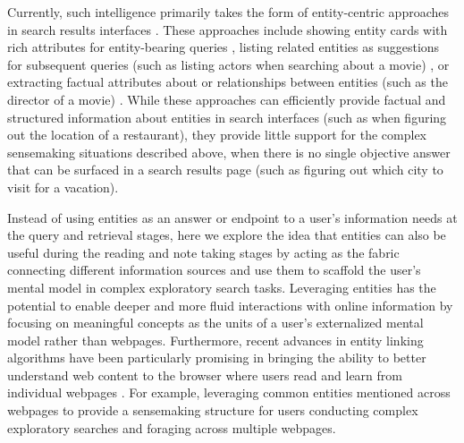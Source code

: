 
Currently, such intelligence primarily takes the form of entity-centric approaches in search results interfaces \cite{guo2009named,lin2012active}. These approaches include showing entity cards with rich attributes for entity-bearing queries \cite{miliaraki2015selena,bota}, listing related entities as suggestions for subsequent queries (such as listing actors when searching about a movie) \cite{blanco2013entity,bordino2013penguins,klouche2015designing}, or extracting factual attributes about or relationships between entities (such as the director of a movie) \cite{balog2010overview,cheng2007entityrank,D15-1038}. While these approaches can efficiently provide factual and structured information about entities in search interfaces (such as when figuring out the location of a restaurant), they provide little support for the complex sensemaking situations described above, when there is no single objective answer that can be surfaced in a search results page (such as figuring out which city to visit for a vacation).

Instead of using entities as an answer or endpoint to a user's information needs at the query and retrieval stages, here we explore the idea that entities can also be useful during the reading and note taking stages by acting as the fabric connecting different information sources and use them to scaffold the user's mental model in complex exploratory search tasks. Leveraging entities has the potential to enable deeper and more fluid interactions with online information by focusing on meaningful concepts as the units of a user's externalized mental model rather than webpages. Furthermore, recent advances in entity linking algorithms have been particularly promising in bringing the ability to better understand web content to the browser where users read and learn from individual webpages \cite{spotlight}. For example, leveraging common entities mentioned across webpages to provide a sensemaking structure for users conducting complex exploratory searches and foraging across multiple webpages.

